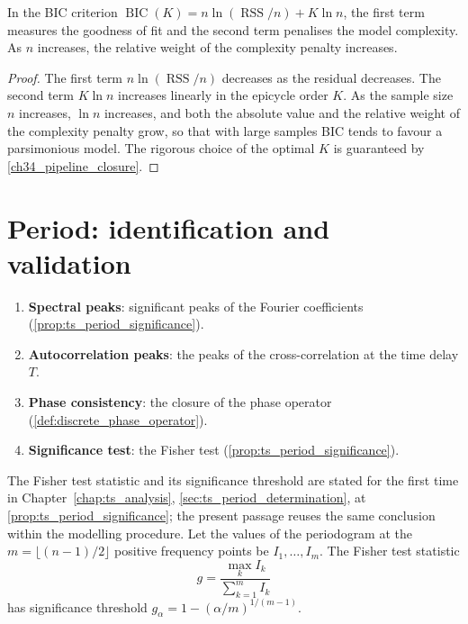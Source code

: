 \begin{proposition}\label{prop:bic_balance}
In the BIC criterion $\operatorname{BIC}(K) = n\ln(\operatorname{RSS}/n) + K\ln n$, the first term measures the goodness of fit and the second term penalises the model complexity. As $n$ increases, the relative weight of the complexity penalty increases.
\end{proposition}

\begin{proof}
The first term $n\ln(\operatorname{RSS}/n)$ decreases as the residual decreases. The second term $K\ln n$ increases linearly in the epicycle order $K$. As the sample size $n$ increases, $\ln n$ increases, and both the absolute value and the relative weight of the complexity penalty grow, so that with large samples BIC tends to favour a parsimonious model. The rigorous choice of the optimal $K$ is guaranteed by \cref{ch34_pipeline_closure}.
\end{proof}

\section{Period: identification and validation}

\begin{definition}\label{def:period_identification}
\begin{enumerate}[label=(\roman*)]
    \item \textbf{Spectral peaks}: significant peaks of the Fourier coefficients (\cref{prop:ts_period_significance}).
    \item \textbf{Autocorrelation peaks}: the peaks of the cross-correlation at the time delay $T$.
    \item \textbf{Phase consistency}: the closure of the phase operator (\cref{def:discrete_phase_operator}).
    \item \textbf{Significance test}: the Fisher test (\cref{prop:ts_period_significance}).
\end{enumerate}
\end{definition}

\begin{proposition}\label{prop:fisher_threshold}
The Fisher test statistic and its significance threshold are stated for the first time in Chapter~\ref{chap:ts_analysis}, \cref{sec:ts_period_determination}, at \cref{prop:ts_period_significance}; the present passage reuses the same conclusion within the modelling procedure.
Let the values of the periodogram at the $m = \lfloor (n-1)/2 \rfloor$ positive frequency points be $I_1, \dots, I_m$. The Fisher test statistic
\[
g = \frac{\max_k I_k}{\sum_{k=1}^{m} I_k}
\]
has significance threshold $g_\alpha = 1 - (\alpha/m)^{1/(m-1)}$.
\end{proposition}

